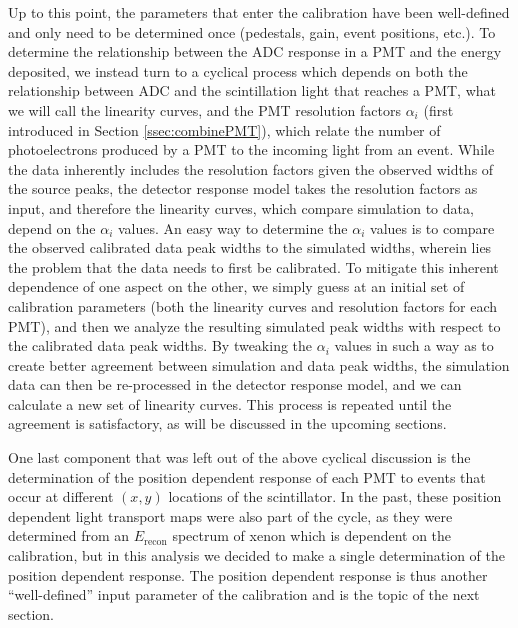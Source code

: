 Up to this point, the parameters that enter the calibration have been well-defined and only need
to be determined once (pedestals, gain, event positions, etc.). To determine
the relationship between the ADC response in a PMT and the energy deposited, we instead turn to a cyclical process which
depends on both the relationship between ADC and the scintillation light that reaches a PMT,
what we will call the linearity curves, and the
PMT resolution factors $\alpha_i$ (first introduced in Section \ref{ssec:combinePMT}), which relate
the number of photoelectrons produced by a PMT to the incoming light from an event. While the data
inherently includes the resolution factors given the observed widths of the source peaks, the detector
response model takes the resolution factors as input, and therefore the linearity curves, which compare
simulation to data, depend on the $\alpha_i$ values. An easy way to determine the $\alpha_i$ values
is to compare the observed calibrated data peak widths to the simulated widths, wherein lies the problem
that the data needs to first be calibrated. To mitigate this inherent dependence of one aspect on the other,
we simply guess at an initial set of calibration parameters (both the linearity curves and resolution factors
for each PMT), and then we analyze the resulting simulated peak widths with respect to the calibrated data peak widths.
By tweaking the $\alpha_i$
values in such a way as to create better agreement between simulation and data peak widths, the simulation data can
then be re-processed in the
detector response model, and we can calculate a new set of linearity curves. This process is repeated until the agreement is
satisfactory, as will be discussed in the upcoming sections.

One last component that was left out of the above cyclical discussion is the determination of the position
dependent response of each PMT to events that occur at different $(x,y)$ locations of the scintillator.
In the past, these position dependent light transport maps were also part of the cycle, as they were
determined from an $E_{\mathrm{recon}}$ spectrum of xenon which is dependent on the calibration, but in this analysis
we decided to make a single determination of the position dependent response. The position dependent response is thus
another ``well-defined'' input parameter of the calibration and is the topic of the next section.

